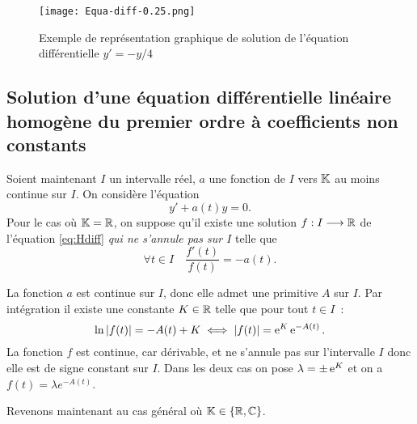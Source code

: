 \begin{figure}
  \centering
  \texttt{[image: Equa-diff-0.25.png]}
  \caption{Exemple de représentation graphique de solution de l'équation
  différentielle \(y' = -y/4\)}
  \label{fig:eqdiff1}
\end{figure}

\subsection[Solution équation homogène coefficients non constants]{Solution
  d'une équation différentielle linéaire homogène du premier ordre à
coefficients non constants}

Soient maintenant \(I\) un intervalle réel, \(a\) une fonction de \(I\) vers
\(\mathbb{K}\) au moins continue sur \(I\). On considère l'équation
\begin{equation}
  \label{eq:Hdiff}
  y' + a(t)y = 0 \tag{\(\H\)}.
\end{equation}
Pour le cas où \(\mathbb{K} = \mathbb{R}\), on suppose qu'il existe une solution
\(f:I \longrightarrow{} \mathbb{R}\) de l'équation \eqref{eq:Hdiff} \emph{qui ne s'annule pas
sur \(I\)} telle que
\begin{equation}
  \forall t \in I \quad \frac{f'(t)}{f(t)} = -a(t).
\end{equation}

La fonction \(a\) est continue sur \(I\), donc elle admet une primitive \(A\)
sur \(I\). Par intégration il existe une constante \(K \in \mathbb{R}\) telle que pour
tout \(t \in I\)~:
\begin{equation}
  \ln\left\lvert f(t)\right\rvert = -A(t)  + K \iff \left\lvert f(t)\right\rvert = \operatorname{e}^K \operatorname{e}^{-A(t)}.
\end{equation}
La fonction \(f\) est continue, car dérivable, et ne s'annule pas sur
l'intervalle \(I\) donc elle est de signe constant sur \(I\). Dans les deux cas
on pose \(\lambda = \pm \operatorname{e}^K\) et on a \(f(t) = \lambda e^{-A(t)}\).

Revenons maintenant au cas général où \(\mathbb{K} \in \{\mathbb{R}, \mathbb{C}\}\).

